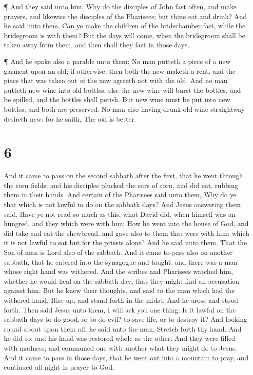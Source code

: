  ¶ And they said unto him, Why do the disciples of John
fast often, and make prayers, and likewise the disciples of the
Pharisees; but thine eat and drink?  And he said unto them,
Can ye make the children of the bridechamber fast, while the bridegroom
is with them?  But the days will come, when the bridegroom
shall be taken away from them, and then shall they fast in those days.

 ¶ And he spake also a parable unto them; No man putteth a
piece of a new garment upon an old; if otherwise, then both the new
maketh a rent, and the piece that was taken out of the new agreeth not
with the old.  And no man putteth new wine into old
bottles; else the new wine will burst the bottles, and be spilled, and
the bottles shall perish.  But new wine must be put into
new bottles; and both are preserved.  No man also having
drunk old wine straightway desireth new: for he saith, The old is
better.

\hypertarget{section-5}{%
\section{6}\label{section-5}}

 And it came to pass on the second sabbath after the first,
that he went through the corn fields; and his disciples plucked the ears
of corn, and did eat, rubbing them in their hands.  And
certain of the Pharisees said unto them, Why do ye that which is not
lawful to do on the sabbath days?  And Jesus answering them
said, Have ye not read so much as this, what David did, when himself was
an hungred, and they which were with him;  How he went into
the house of God, and did take and eat the shewbread, and gave also to
them that were with him; which it is not lawful to eat but for the
priests alone?  And he said unto them, That the Son of man
is Lord also of the sabbath.  And it came to pass also on
another sabbath, that he entered into the synagogue and taught: and
there was a man whose right hand was withered.  And the
scribes and Pharisees watched him, whether he would heal on the sabbath
day; that they might find an accusation against him.  But he
knew their thoughts, and said to the man which had the withered hand,
Rise up, and stand forth in the midst. And he arose and stood forth.
 Then said Jesus unto them, I will ask you one thing; Is it
lawful on the sabbath days to do good, or to do evil? to save life, or
to destroy it?  And looking round about upon them all, he
said unto the man, Stretch forth thy hand. And he did so: and his hand
was restored whole as the other.  And they were filled with
madness; and communed one with another what they might do to Jesus.
 And it came to pass in those days, that he went out into a
mountain to pray, and continued all night in prayer to God.

